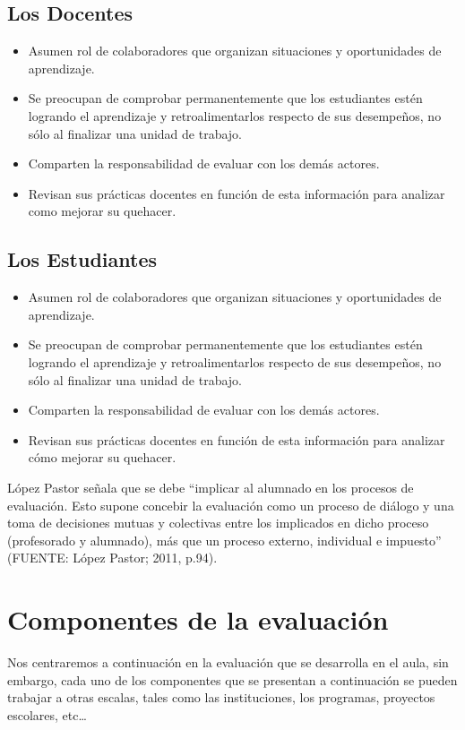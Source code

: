 \documentclass[12pt,letterpaper,article,x11names]{memoir}
\begin{document}
\subsection{Los Docentes}
\label{sec:orgb9fecef}
\begin{itemize}
\item Asumen rol de colaboradores que organizan situaciones y oportunidades de aprendizaje.
\item Se preocupan de comprobar permanentemente que los estudiantes estén logrando el aprendizaje y retroalimentarlos respecto de sus desempeños, no sólo al finalizar una unidad de trabajo.
\item Comparten la responsabilidad de evaluar con los demás actores.
\item Revisan sus prácticas docentes en función de esta información para analizar como mejorar su quehacer.
\end{itemize}

\subsection{Los Estudiantes}
\label{sec:orge711ae3}
\begin{itemize}
\item Asumen rol de colaboradores que organizan situaciones y oportunidades de aprendizaje.
\item Se preocupan de comprobar permanentemente que los estudiantes estén logrando el aprendizaje y retroalimentarlos respecto de sus desempeños, no sólo al finalizar una unidad de trabajo.
\item Comparten la responsabilidad de evaluar con los demás actores.
\item Revisan sus prácticas docentes en función de esta información para analizar cómo mejorar su quehacer.
\end{itemize}


López Pastor señala que se debe “implicar al alumnado en los procesos de evaluación. Esto supone concebir la evaluación como un proceso de diálogo y una toma de decisiones mutuas y colectivas entre los implicados en dicho proceso (profesorado y alumnado), más que un proceso externo, individual e impuesto” (FUENTE: López Pastor; 2011, p.94).

\section{Componentes de la evaluación}
\label{sec:org29e5572}
Nos centraremos a continuación en la evaluación que se desarrolla en el aula, sin embargo, cada uno de los componentes que se presentan a continuación se pueden trabajar a otras escalas, tales como las instituciones, los programas, proyectos escolares, etc…
\end{document}
